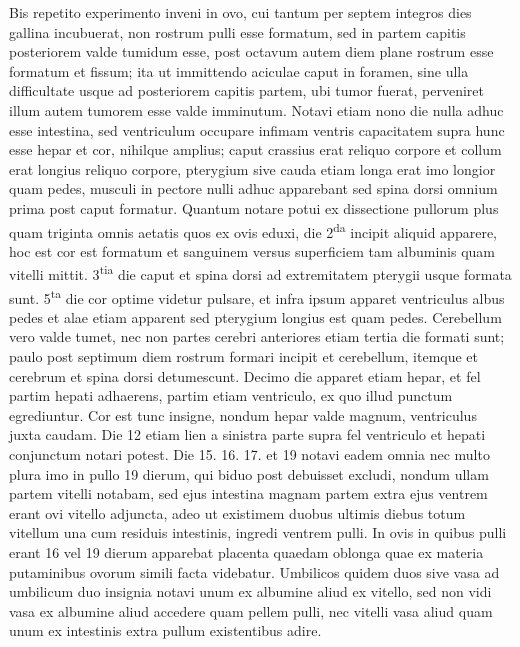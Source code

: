 \pstart%
Bis repetito experimento inveni in ovo, cui tantum per septem integros dies gallina incubuerat, non rostrum pulli esse formatum, sed in partem capitis posteriorem valde tumidum esse, post octavum autem diem plane rostrum esse formatum et fissum; ita ut immittendo aciculae caput in foramen, sine ulla difficultate usque ad posteriorem capitis partem, ubi tumor fuerat, perveniret illum autem tumorem esse valde imminutum.
\pend%
\pstart%
Notavi etiam nono die nulla adhuc esse intestina, sed ventriculum occupare infimam ventris capacitatem supra hunc esse hepar et cor, nihilque amplius; caput crassius erat reliquo corpore et collum erat longius reliquo corpore, pterygium sive cauda etiam longa erat imo longior quam pedes, musculi in pectore nulli adhuc apparebant sed spina dorsi omnium prima post caput formatur.
\pend%
\pstart%
Quantum notare potui ex dissectione pullorum plus quam triginta omnis aetatis quos ex ovis eduxi, die 2\textsuperscript{da} incipit aliquid apparere, hoc est cor est formatum et sanguinem versus superficiem tam albuminis quam vitelli mittit. 3\textsuperscript{tia} die caput et spina dorsi ad extremitatem pterygii usque formata sunt. 5\textsuperscript{ta} die cor optime videtur pulsare, et infra ipsum apparet ventriculus albus pedes et alae etiam apparent sed pterygium longius est quam pedes. Cerebellum vero valde tumet, nec non partes cerebri anteriores
etiam tertia die formati sunt; paulo post septimum diem rostrum formari incipit et cerebellum, itemque et cerebrum et spina dorsi detumescunt. Decimo die apparet etiam hepar, et fel partim hepati adhaerens, partim etiam ventriculo, ex quo illud punctum 
\pend
\newpage
\pstart\noindent egrediuntur. Cor est tunc insigne, nondum hepar valde magnum, ventriculus juxta caudam. Die 12 etiam lien a sinistra parte supra fel ventriculo et hepati conjunctum notari potest. Die 15. 16. 17. et 19 notavi eadem omnia nec multo plura imo in pullo 19 dierum, qui biduo post debuisset excludi, nondum ullam partem vitelli notabam, sed ejus intestina magnam partem extra ejus ventrem erant ovi vitello adjuncta, adeo ut existimem duobus ultimis diebus totum vitellum una cum residuis intestinis, ingredi ventrem pulli.
\pend%
\pstart%
In ovis in quibus pulli erant 16 vel 19 dierum apparebat placenta quaedam oblonga quae ex materia putaminibus ovorum simili facta videbatur.
\pend%
\pstart%
Umbilicos quidem duos sive vasa ad umbilicum duo insignia notavi unum ex albumine aliud ex vitello, sed non vidi vasa ex albumine aliud accedere quam pellem pulli, nec vitelli vasa aliud quam unum ex intestinis extra pullum existentibus adire.%
\pend%
\count{}
\count{}
\count{}